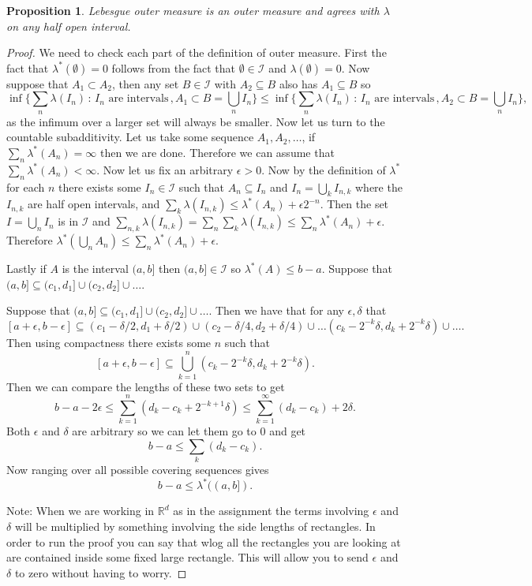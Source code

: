 \documentclass[11pt]{article}
\newtheorem{prp}[thm]{Proposition}
\theoremstyle{definition}
\theoremstyle{remark}
\begin{document}
\begin{prp}
Lebesgue outer measure is an outer measure and agrees with $\lambda$ on any half open interval.
\end{prp}
\begin{proof}
We need to check each part of the definition of outer measure. First the fact that $\lambda^*(\emptyset) = 0$ follows from the fact that $\emptyset \in \mathcal{I}$ and $\lambda(\emptyset) = 0$. Now suppose that $A_1 \subset A_2$, then any set $B \in \mathcal{I}$ with $A_2 \subseteq B$ also has $A_1 \subseteq B$ so 
\[ \inf \{ \sum_n\lambda (I_n) \, : \, \mbox{$I_n$ are intervals}\,, A_1 \subset B = \bigcup_n I_n\} \leq \inf \{ \sum_n\lambda (I_n) \, : \, \mbox{$I_n$ are intervals}\,, A_2 \subset B = \bigcup_n I_n\}, \] as the infimum over a larger set will always be smaller. Now let us turn to the countable subadditivity. Let us take some sequence $A_1, A_2, \dots$, if $\sum_n \lambda^*(A_n) = \infty$ then we are done. Therefore we can assume that $\sum_n \lambda^*(A_n) < \infty$. Now let us fix an arbitrary $\epsilon>0$. Now by the definition of $\lambda^*$ for each $n$ there exists some $I_n \in \mathcal{I}$ such that $A_n \subseteq I_n$ and $I_n = \bigcup_k I_{n,k}$ where the $I_{n,k}$ are half open intervals, and $\sum_k\lambda(I_{n,k}) \leq \lambda^* (A_n) + \epsilon 2^{-n}$. Then the set $I = \bigcup_n I_n$ is in $\mathcal{I}$ and $\sum_{n,k}\lambda(I_{n,k}) = \sum_n \sum_k\lambda(I_{n,k}) \leq \sum_n \lambda^*(A_n) + \epsilon$. Therefore $\lambda^*(\bigcup_n A_n) \leq  \sum_n \lambda^*(A_n) + \epsilon$.

Lastly if $A$ is the interval $(a,b]$ then $(a,b] \in \mathcal{I}$ so $\lambda^*(A) \leq b-a$. Suppose that $(a,b] \subseteq (c_1,d_1] \cup (c_2, d_2] \cup \dots$. 

 Suppose that $(a,b] \subseteq (c_1,d_1] \cup (c_2, d_2] \cup \dots$.  Then we have that for any $\epsilon, \delta$ that 
\[ [a+\epsilon, b-\epsilon] \subseteq (c_1-\delta/2, d_1 + \delta/2) \cup (c_2 - \delta/4, d_2 + \delta/4) \cup \dots (c_k -2^{-k} \delta, d_k + 2^{-k} \delta) \cup \dots.  \] Then using compactness there exists some $n$ such that
\[ [a+\epsilon, b-\epsilon] \subseteq \bigcup_{k=1}^n (c_k -2^{-k}\delta, d_k + 2^{-k} \delta). \] Then we can compare the lengths of these two sets to get
\[ b-a - 2\epsilon \leq \sum_{k=1}^n (d_k - c_k + 2^{-k+1} \delta) \leq \sum_{k=1}^\infty (d_k-c_k) + 2 \delta. \] Both $\epsilon$ and $\delta$ are arbitrary so we can let them go to $0$ and get
\[ b-a \leq \sum_k (d_k - c_k). \]  Now ranging over all possible covering sequences gives
\[ b-a \leq \lambda^*((a,b]). \]

Note: When we are working in $\mathbb{R}^d$ as in the assignment the terms involving $\epsilon$ and $\delta$ will be multiplied by something involving the side lengths of rectangles. In order to run the proof you can say that wlog all the rectangles you are looking at are contained inside some fixed large rectangle. This will allow you to send $\epsilon$ and $\delta$ to zero without having to worry.
\end{proof}
\end{document}
